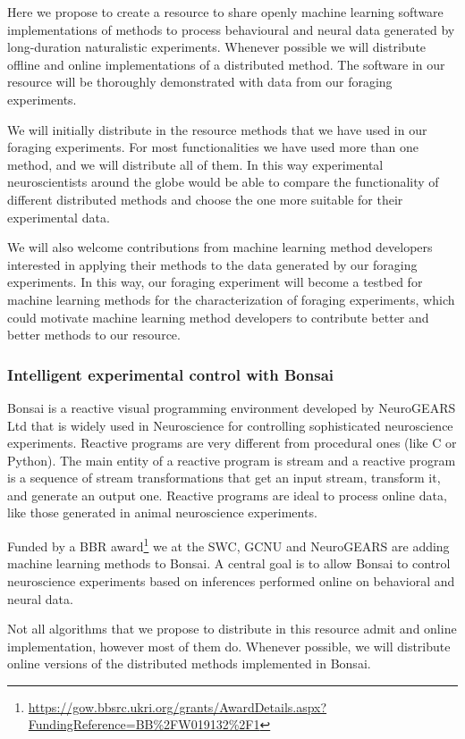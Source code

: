 Here we propose to create a resource to share openly machine learning software
implementations of methods to process behavioural and neural data generated by
long-duration naturalistic experiments. Whenever possible we will distribute
offline and online implementations of a distributed method. The software in our
resource will be thoroughly demonstrated with data from our foraging
experiments.

We will initially distribute in the resource methods that we have used in our
foraging experiments. For most functionalities we have used more than one
method, and we will distribute all of them. In this way experimental
neuroscientists around the globe would be able to compare the functionality of
different distributed methods and choose the one more suitable for their
experimental data.

We will also welcome contributions from machine learning method developers
interested in applying their methods to the data generated by our foraging
experiments. In this way, our foraging experiment will become a testbed for
machine learning methods for the characterization of foraging experiments,
which could motivate machine learning method developers to contribute better
and better methods to our resource.

\subsubsection*{Intelligent experimental control with Bonsai}

Bonsai is a reactive visual programming environment developed by NeuroGEARS Ltd
that is widely used in Neuroscience for controlling sophisticated neuroscience
experiments. Reactive programs are very different from procedural ones (like C
or Python). The main entity of a reactive program is stream and a reactive
program is a sequence of stream transformations that get an input stream,
transform it, and generate an output one. Reactive programs are ideal to
process online data, like those generated in animal neuroscience experiments.

Funded by a BBR
award\footnote{\url{https://gow.bbsrc.ukri.org/grants/AwardDetails.aspx?FundingReference=BB\%2FW019132\%2F1}}
we at the SWC, GCNU and NeuroGEARS are adding machine learning methods to
Bonsai. A central goal is to allow Bonsai to control neuroscience experiments
based on inferences performed online on behavioral and neural data.

Not all algorithms that we propose to distribute in this resource admit and
online implementation, however most of them do. Whenever possible, we will
distribute online versions of the distributed methods implemented in Bonsai.

